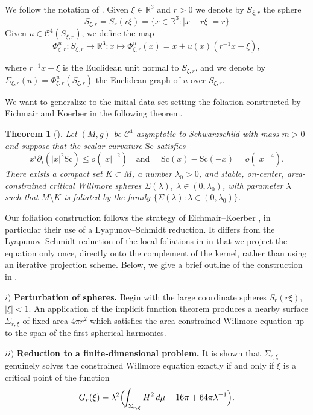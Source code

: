 \documentclass[12pt,a4paper]{amsart}
\theoremstyle{plain}
\newtheorem{theorem}{Theorem}[section]
\theoremstyle{definition}
\begin{document}
We follow the notation of \cite{eichko}. Given $\xi \in \mathbb{R}^3$ and $r>0$ we denote by $S_{\xi, r}$ the sphere  
$$S_{\xi, r}= S_r (r \xi)= \{ 
x \in \mathbb{R}^3 : |x-r \xi|= r   \}$$
Given $u \in \mathcal{C}^4(S_{\xi, r}) $, we define the map
$$\Phi^u_{\xi, r}:S_{\xi, r} \longrightarrow \mathbb{R}^3 : x\mapsto  \Phi^u_{\xi, r}(x) =x +u(x)(r^{-1} x - \xi), $$

where  $r^{-1} x - \xi$ is the Euclidean unit normal to $ S_{\xi, r}$, and we denote by $\Sigma_{\xi, r }(u)= \Phi^u_{\xi, r}(S_{\xi, r} )$ the Euclidean graph of $u$ over $S_{\xi, r}$.

We want to  generalize to the initial data set setting  the  foliation constructed by Eichmair and Koerber in the following theorem.
\begin{theorem}[{\cite[Theorem 5]{eichko}}]    
     Let $(M, g)$ be $\mathcal{C}^4$-asymptotic to Schwarzschild with mass $m > 0$ and suppose that the scalar curvature $\mathrm{Sc}$ satisfies 
\[
x^i \partial_i\left(|x|^2 \mathrm{Sc}\right) \leq o(|x|^{-2})\quad  \text{and } \quad \mathrm{Sc}(x) - \mathrm{Sc}(-x) = o(|x|^{-4}).
\]
There exists a compact set $K \subset M$, a number $\lambda_0 > 0$, and stable, on-center, area-constrained critical Willmore spheres  $\Sigma(\lambda)$, $\lambda \in (0, \lambda_0)$,  with parameter $\lambda$ such that $M \setminus K$ is foliated by the family $\{\Sigma(\lambda) : \lambda \in (0, \lambda_0)\}$. 
 \end{theorem}
Our foliation construction follows the strategy of Eichmair–Koerber \cite{eichko}, in particular their use of a Lyapunov–Schmidt reduction. It differs from the Lyapunov–Schmidt reduction of the local foliations in \cite{diaz2023local} in that we project the equation only once, directly onto the complement of the kernel, rather than using an iterative projection scheme. Below, we give a brief outline of the construction in \cite{eichko}.



$ i)$ \textbf{Perturbation of spheres.} 
    Begin with the large coordinate spheres
    $S_r(r\xi)$, $ |\xi|<1$. An application of the implicit function theorem produces a nearby surface \(\Sigma_{r,\xi}\) of fixed area \(4\pi r^2\) which satisfies the area‐constrained Willmore  equation up to the span of the first spherical harmonics.



$ii)$ \textbf{Reduction to a finite‐dimensional problem.} 
    It is shown that \(\Sigma_{r,\xi}\) genuinely solves the constrained Willmore equation exactly if and only if \(\xi\) is a critical point of the  function
    \[
      G_r(\xi)
      = \lambda^2\Bigl(\!\int_{\Sigma_{r,\xi}}H^2\,d\mu - 16\pi + 64\pi\lambda^{-1}\Bigr).
    \]
\end{document}
